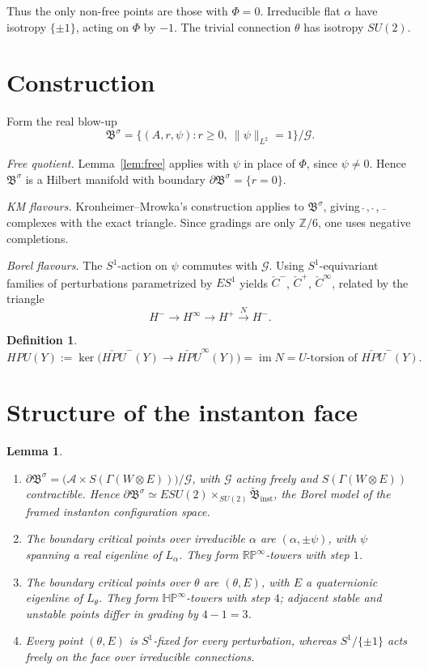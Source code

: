 \documentclass[11pt]{amsart}
\newtheorem{lemma}{Lemma}
\theoremstyle{definition}
\newtheorem{definition}{Definition}
\theoremstyle{remark}
\newcommand{\Z}{\mathbb{Z}}
\newcommand{\RP}{\mathbb{RP}}
\newcommand{\HP}{\mathbb{HP}}
\newcommand{\cA}{\mathcal{A}}
\newcommand{\cG}{\mathcal{G}}
\newcommand{\B}{\mathfrak{B}}
\newcommand{\HPU}{\mathit{HPU}}
\newcommand{\cHPU}{\check{\mathit{HPU}}}
\DeclareMathOperator{\im}{im}
\begin{document}
Thus the only non-free points are those with $\Phi=0$. Irreducible flat
$\alpha$ have isotropy $\{\pm1\}$, acting on $\Phi$ by $-1$. The trivial
connection $\theta$ has isotropy $SU(2)$.

\section{Construction}

Form the real blow-up
\[
\B^\sigma=\{(A,r,\psi): r\ge0,\ \|\psi\|_{L^2}=1\}/\cG.
\]

\emph{Free quotient.} Lemma~\ref{lem:free} applies with $\psi$ in place of
$\Phi$, since $\psi\neq0$. Hence $\B^\sigma$ is a Hilbert manifold with
boundary $\partial\B^\sigma=\{r=0\}$.

\emph{KM flavours.} Kronheimer--Mrowka's construction applies to
$\B^\sigma$, giving $\check{\ }$, $\hat{\ }$, $\bar{\ }$ complexes with the
exact triangle. Since gradings are only $\Z/6$, one uses negative
completions.

\emph{Borel flavours.} The $S^1$-action on $\psi$ commutes with $\cG$.
Using $S^1$-equivariant families of perturbations parametrized by $ES^1$
yields $\check C^-$, $\check C^+$, $\check C^\infty$, related by the
triangle
\[
H^-\to H^\infty\to H^+\xrightarrow{\;N\;}H^-.
\]

\begin{definition}
\[
\HPU(Y):=\ker\big(\cHPU^-(Y)\to\cHPU^\infty(Y)\big)=\im N
=U\text{-torsion of }\cHPU^-(Y).
\]
\end{definition}

\section{Structure of the instanton face}

\begin{lemma}\label{lem:face}
\leavevmode
\begin{enumerate}[label=(\alph*)]
\item $\partial\B^\sigma=\big(\cA\times S(\Gamma(W\otimes E))\big)/\cG$,
  with $\cG$ acting freely and $S(\Gamma(W\otimes E))$ contractible. Hence
  $\partial\B^\sigma\simeq ESU(2)\times_{SU(2)}\widetilde{\B}_{\mathrm{inst}}$,
  the Borel model of the framed instanton configuration space.
\item The boundary critical points over irreducible $\alpha$ are
  $(\alpha,\pm\psi)$, with $\psi$ spanning a real eigenline of $L_\alpha$.
  They form $\RP^\infty$-towers with step $1$.
\item The boundary critical points over $\theta$ are $(\theta,E)$, with $E$
  a quaternionic eigenline of $L_\theta$. They form $\HP^\infty$-towers
  with step $4$; adjacent stable and unstable points differ in grading by
  $4-1=3$.
\item Every point $(\theta,E)$ is $S^1$-fixed for every perturbation,
  whereas $S^1/\{\pm1\}$ acts freely on the face over irreducible
  connections.
\end{enumerate}
\end{lemma}
\end{document}
